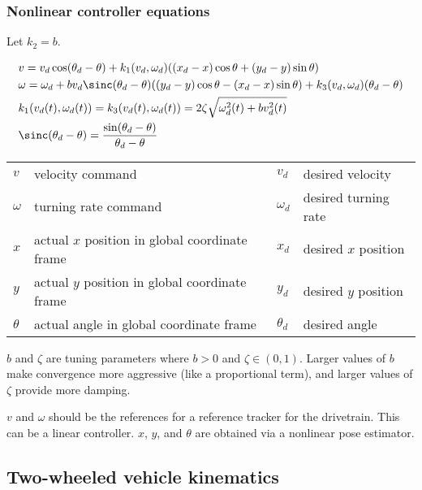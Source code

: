\subsubsection{Nonlinear controller equations}

Let $k_2 = b$.

\begin{theorem}
  \begin{align}
    &v = v_d \cos(\theta_d - \theta) + k_1(v_d, \omega_d)((x_d - x)\cos\theta +
      (y_d - y)\sin\theta) \\
    &\omega = \omega_d +
      b v_d\sinc(\theta_d - \theta)((y_d - y)\cos\theta - (x_d - x)\sin\theta) +
      k_3 (v_d, \omega_d)(\theta_d - \theta) \\
    &k_1(v_d(t), \omega_d(t)) = k_3(v_d(t), \omega_d(t)) =
      2\zeta\sqrt{\omega_d^2(t) + bv_d^2(t)} \\
    &\sinc(\theta_d - \theta) =
      \frac{\sin(\theta_d - \theta)}{\theta_d - \theta}
  \end{align}

  \begin{figurekey}
    \begin{tabulary}{\linewidth}{LLLL}
      $v$ & velocity command & $v_d$ & desired velocity \\
      $\omega$ & turning rate command & $\omega_d$ & desired turning rate \\
      $x$ & actual $x$ position in global coordinate frame & $x_d$ &
        desired $x$ position \\
      $y$ & actual $y$ position in global coordinate frame & $y_d$ &
        desired $y$ position \\
      $\theta$ & actual angle in global coordinate frame & $\theta_d$ &
        desired angle
    \end{tabulary}
  \end{figurekey}

  $b$ and $\zeta$ are tuning parameters where $b > 0$ and $\zeta \in (0, 1)$.
  Larger values of $b$ make convergence more aggressive (like a proportional
  term), and larger values of $\zeta$ provide more damping.
\end{theorem}

$v$ and $\omega$ should be the \glspl{reference} for a \gls{reference} tracker
for the drivetrain. This can be a linear controller. $x$, $y$, and $\theta$ are
obtained via a nonlinear \gls{pose} estimator.

\subsection{Two-wheeled vehicle kinematics}

